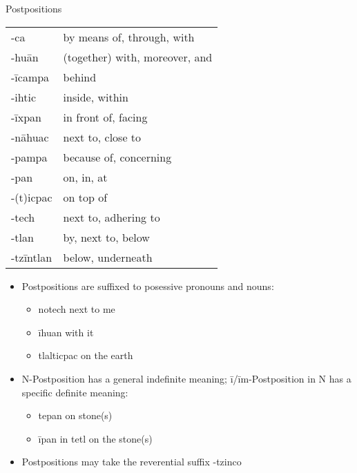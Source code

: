 \documentclass[12pt]{beamer}
\newcommand{\nah}[1]{\textcolor{nahgrn}{#1}}
\newcommand{\trs}[1]{\textcolor{nahblu}{#1}}
\begin{document}
\begin{frame}
\begin{columns}[t]
\begin{column}{.20\linewidth}
\begin{block}{Postpositions}
\begin{tabular}{ll}
          \nah{-ca}       & \trs{by means of, through, with}     \\
          \nah{-huān}     & \trs{(together) with, moreover, and} \\
          \nah{-īcampa}   & \trs{behind}                         \\
          \nah{-ihtic}    & \trs{inside, within}                 \\
          \nah{-īxpan}    & \trs{in front of, facing}            \\
          \nah{-nāhuac}   & \trs{next to, close to}              \\
          \nah{-pampa}    & \trs{because of, concerning}         \\
          \nah{-pan}      & \trs{on, in, at}                     \\
          \nah{-(t)icpac} & \trs{on top of}                      \\
          \nah{-tech}     & \trs{next to, adhering to}           \\
          \nah{-tlan}     & \trs{by, next to, below}             \\
          \nah{-tzīntlan} & \trs{below, underneath}              \\
        \end{tabular}%
        \begin{itemize}
          \item Postpositions are suffixed to posessive pronouns and nouns:
                \begin{itemize}
                  \item \nah{notech} \trs{next to me}
                  \item \nah{īhuan} \trs{with it}
                  \item \nah{tlalticpac} \trs{on the earth}
                \end{itemize}
          \item N-Postposition has a general indefinite meaning; \nah{ī/īm}-Postposition \nah{in} N has a specific definite meaning:
                \begin{itemize}
                  \item \nah{tepan} \trs{on stone(s)}
                  \item \nah{īpan in tetl} \trs{on the stone(s)}
                \end{itemize}
          \item Postpositions may take the reverential suffix \nah{-tzinco}
        \end{itemize}
      \end{block}
    \end{column}
  \end{columns}
\end{frame}
\end{document}

